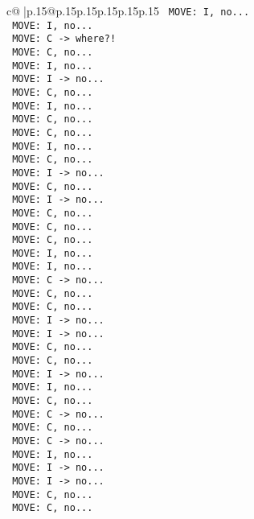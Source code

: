 \documentclass{article}
\begin{document}
{\begin{supertabular}{c@{$\;$}|p{.15\linewidth}@{}p{.15\linewidth}p{.15\linewidth}p{.15\linewidth}p{.15\linewidth}p{.15\linewidth}}
{{{\texttt{ MOVE: I, no...} \\
\texttt{ MOVE: I, no...} \\
\texttt{ MOVE: C {-}> where?!} \\
\texttt{ MOVE: C, no...} \\
\texttt{ MOVE: I, no...} \\
\texttt{ MOVE: I {-}> no...} \\
\texttt{ MOVE: C, no...} \\
\texttt{ MOVE: I, no...} \\
\texttt{ MOVE: C, no...} \\
\texttt{ MOVE: C, no...} \\
\texttt{ MOVE: I, no...} \\
\texttt{ MOVE: C, no...} \\
\texttt{ MOVE: I {-}> no...} \\
\texttt{ MOVE: C, no...} \\
\texttt{ MOVE: I {-}> no...} \\
\texttt{ MOVE: C, no...} \\
\texttt{ MOVE: C, no...} \\
\texttt{ MOVE: C, no...} \\
\texttt{ MOVE: I, no...} \\
\texttt{ MOVE: I, no...} \\
\texttt{ MOVE: C {-}> no...} \\
\texttt{ MOVE: C, no...} \\
\texttt{ MOVE: C, no...} \\
\texttt{ MOVE: I {-}> no...} \\
\texttt{ MOVE: I {-}> no...} \\
\texttt{ MOVE: C, no...} \\
\texttt{ MOVE: C, no...} \\
\texttt{ MOVE: I {-}> no...} \\
\texttt{ MOVE: I, no...} \\
\texttt{ MOVE: C, no...} \\
\texttt{ MOVE: C {-}> no...} \\
\texttt{ MOVE: C, no...} \\
\texttt{ MOVE: C {-}> no...} \\
\texttt{ MOVE: I, no...} \\
\texttt{ MOVE: I {-}> no...} \\
\texttt{ MOVE: I {-}> no...} \\
\texttt{ MOVE: C, no...} \\
\texttt{ MOVE: C, no...} \\
}}}
\end{supertabular}}
\end{document}
